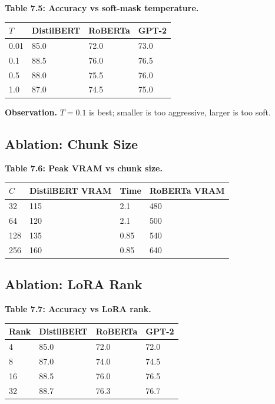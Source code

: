 \textbf{Table 7.5: Accuracy vs soft-mask temperature.}

\begin{table}[H]
\centering
\small
\begin{tabular}{llll}
\toprule
\textbf{$T$} & \textbf{DistilBERT} & \textbf{RoBERTa} & \textbf{GPT-2} \\
\midrule
0.01 & 85.0 & 72.0 & 73.0 \\
0.1 & 88.5 & 76.0 & 76.5 \\
0.5 & 88.0 & 75.5 & 76.0 \\
1.0 & 87.0 & 74.5 & 75.0 \\
\bottomrule
\end{tabular}
\end{table}

\textbf{Observation.} $T = 0.1$ is best; smaller is too aggressive, 
larger is too soft.

\subsection{Ablation: Chunk Size}

\textbf{Table 7.6: Peak VRAM vs chunk size.}

\begin{table}[H]
\centering
\small
\begin{tabular}{llll}
\toprule
\textbf{$C$} & \textbf{DistilBERT VRAM} & \textbf{Time} & \textbf{RoBERTa VRAM} \\
\midrule
32 & 115 & 2.1 & 480 \\
64 & 120 & 2.1 & 500 \\
128 & 135 & 0.85 & 540 \\
256 & 160 & 0.85 & 640 \\
\bottomrule
\end{tabular}
\end{table}

\subsection{Ablation: LoRA Rank}

\textbf{Table 7.7: Accuracy vs LoRA rank.}

\begin{table}[H]
\centering
\small
\begin{tabular}{llll}
\toprule
\textbf{Rank} & \textbf{DistilBERT} & \textbf{RoBERTa} & \textbf{GPT-2} \\
\midrule
4 & 85.0 & 72.0 & 72.0 \\
8 & 87.0 & 74.0 & 74.5 \\
16 & 88.5 & 76.0 & 76.5 \\
32 & 88.7 & 76.3 & 76.7 \\
\bottomrule
\end{tabular}
\end{table}

